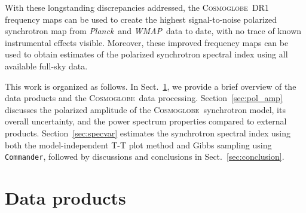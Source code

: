 \documentclass[twocolumn]{../../common/aa}
\def\WMAP{\emph{WMAP}}
\def\Planck{\emph{Planck}}
\def\commander{\texttt{Commander}}
\newcommand{\cosmoglobe}{\textsc{Cosmoglobe}}
\begin{document}
With these longstanding discrepancies addressed, the \cosmoglobe\ DR1 frequency maps can be used to create the highest signal-to-noise polarized synchrotron map from \Planck\ and \WMAP\ data to date, with no trace of known instrumental effects visible. Moreover, these improved frequency maps can be used to obtain estimates of the polarized synchrotron spectral index using all available full-sky data.

This work is organized as follows. In Sect.~\ref{sec:data}, we provide a brief overview of the data products and the \cosmoglobe\ data processing. Section~\ref{sec:pol_amp} discusses the polarized amplitude of the \cosmoglobe\ synchrotron model, its overall uncertainty, and the power spectrum properties compared to external products. Section~\ref{sec:specvar} estimates the synchrotron spectral index using both the model-independent T-T plot method and Gibbs sampling using \commander, followed by discussions and conclusions in Sect.~\ref{sec:conclusion}.







\section{Data products}
\label{sec:data}
\end{document}
